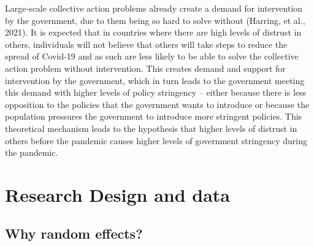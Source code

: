 \documentclass[
  11pt,
]{article}
\begin{document}
Large-scale collective action problems already create a demand for intervention by the government, due to them being so hard to solve without (Harring, et al., 2021). It is expected that in countries where there are high levels of distrust in others, individuals will not believe that others will take steps to reduce the spread of Covid-19 and as such are less likely to be able to solve the collective action problem without intervention. This creates demand and support for intervention by the government, which in turn leads to the government meeting this demand with higher levels of policy stringency -- either because there is less opposition to the policies that the government wants to introduce or because the population pressures the government to introduce more stringent policies. This theoretical mechanism leads to the hypothesis that higher levels of distrust in others before the pandemic causes higher levels of government stringency during the pandemic.\\

\hypertarget{research-design-and-data}{%
\section{Research Design and data}\label{research-design-and-data}}

\hypertarget{why-random-effects}{%
\subsection{Why random effects?}\label{why-random-effects}}
\end{document}
